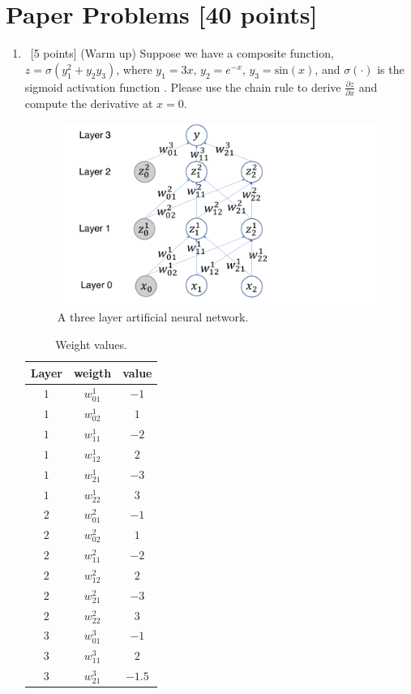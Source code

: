 \documentclass[12pt, fullpage,letterpaper]{article}
\begin{document}
\section{Paper Problems [40 points]}
\begin{enumerate}
	\item~[5 points] (Warm up) Suppose we have a composite function, $z = \sigma(y_1^2 +y_2y_3) $, where  $y_1 = 3x$, $y_2 = e^{-x}$, $y_3 = \mathrm{sin}(x)$, and $\sigma(\cdot)$ is the sigmoid activation function . Please use the chain rule to derive $\frac{\partial z}{\partial x}$ and  compute the derivative at $x=0$. 
	\begin{figure}
		\centering
		\includegraphics[width=1.0\textwidth]{./3-layer-NN.pdf}
		\caption{\small A three layer artificial neural network.} 
		\label{fig:3nn}
	\end{figure}
	
	\begin{table}[h]
		\centering
		\begin{tabular}{c|cc}
			Layer & weigth  & value\\ 
			\hline\hline
			$1$ & $w_{01}^1$ & $-1$ \\ \hline
			$1$ & $w_{02}^1$ & $1$ \\ \hline
			$1$ & $w_{11}^1$ & $-2$ \\ \hline
			$1$ & $w_{12}^1$ & $2$ \\ \hline
			$1$ & $w_{21}^1$ & $-3$ \\ \hline
			$1$ & $w_{22}^1$ & $3$ \\ \hline
			$2$ & $w_{01}^2$ & $-1$ \\ \hline
			$2$ & $w_{02}^2$ & $1$ \\ \hline
			$2$ & $w_{11}^2$ & $-2$ \\ \hline
			$2$ & $w_{12}^2$ & $2$ \\ \hline
			$2$ & $w_{21}^2$ & $-3$ \\ \hline
			$2$ & $w_{22}^2$ & $3$ \\ \hline
			$3$ & $w_{01}^3$ & $-1$ \\ \hline
			$3$ & $w_{11}^3$ & $2$ \\ \hline
			$3$ & $w_{21}^3$ & $-1.5$ \\ \hline
		\end{tabular}
		\caption{Weight values.}
		\label{tb:w}
	\end{table}
	

\end{enumerate}
\end{document}
